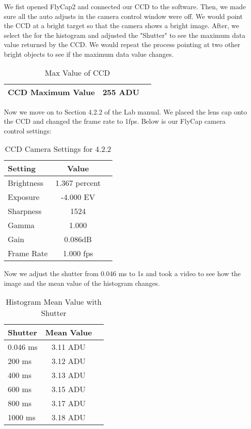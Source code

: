 \documentclass[10pt, preprint]{aastex}
\begin{document}
We fist opened FlyCap2 and connected our CCD to the software. Then, we made sure all the auto adjusts in the camera control window were off. We would point the CCD at a bright target so that the camera shows a bright image. After, we select the  for the histogram and adjusted the "Shutter" to see the maximum data value returned by the CCD. We would repeat the process pointing at two other bright objects to see if the maximum data value changes. 



\begin{table}[H]
\centering
\begin{tabular}{lcr}
\hline
CCD Maximum Value & 255 ADU\\\hline
\end{tabular}
\caption{\label{table:CCDMax}Max Value of CCD}
\end{table}

Now we move on to Section 4.2.2 of the Lab manual. We placed the lens cap onto the CCD and changed the frame rate to 1fps. Below is our FlyCap camera control settings:

\begin{table}[H]
\centering
\begin{tabular}{lcr}
\hline
Setting & Value\\\hline
Brightness & 1.367 percent \\
Exposure & -4.000 EV\\
Sharpness & 1524 \\
Gamma & 1.000\\
Gain & 0.086dB\\
Frame Rate & 1.000 fps \\
\end{tabular}
\caption{\label{table:CCDSettings4.2.2}CCD Camera Settings for 4.2.2}
\end{table}

Now we adjust the shutter from 0.046 ms to 1s and took a video to see how the image and the mean value of the histogram changes.

\begin{table}[H]
\centering
\begin{tabular}{lcr}
\hline
Shutter & Mean Value\\\hline
0.046 ms & 3.11 ADU \\
200 ms & 3.12 ADU \\
400 ms & 3.13 ADU \\
600 ms & 3.15 ADU \\
800 ms & 3.17 ADU\\
1000 ms & 3.18 ADU\\
\end{tabular}
\caption{\label{table:meanvalue}Histogram Mean Value with Shutter}
\end{table}
\end{document}
